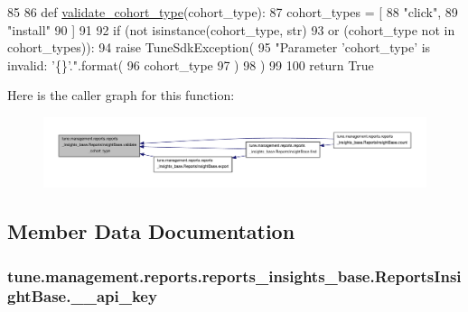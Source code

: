 \begin{DoxyCode}
85 
86     \textcolor{keyword}{def }\hyperlink{classtune_1_1management_1_1reports_1_1reports__insights__base_1_1ReportsInsightBase_a78f6a5bfe7258d65e381281510ae9909}{validate\_cohort\_type}(cohort\_type):
87         cohort\_types = [
88             \textcolor{stringliteral}{"click"},
89             \textcolor{stringliteral}{"install"}
90         ]
91 
92         \textcolor{keywordflow}{if} (\textcolor{keywordflow}{not} isinstance(cohort\_type, str)
93             \textcolor{keywordflow}{or} (cohort\_type \textcolor{keywordflow}{not} \textcolor{keywordflow}{in} cohort\_types)):
94             \textcolor{keywordflow}{raise} TuneSdkException(
95                 \textcolor{stringliteral}{"Parameter 'cohort\_type' is invalid: '\{\}'."}.format(
96                 cohort\_type
97                 )
98             )
99 
100         \textcolor{keywordflow}{return} \textcolor{keyword}{True}

\end{DoxyCode}


Here is the caller graph for this function\-:
\nopagebreak
\begin{figure}[H]
\begin{center}
\leavevmode
\includegraphics[width=350pt]{classtune_1_1management_1_1reports_1_1reports__insights__base_1_1ReportsInsightBase_a78f6a5bfe7258d65e381281510ae9909_icgraph}
\end{center}
\end{figure}




\subsection{Member Data Documentation}
\hypertarget{classtune_1_1management_1_1reports_1_1reports__insights__base_1_1ReportsInsightBase_a0d22e330edc50e64ff0a26b6f6f6154a}{
\subsubsection[{\-\_\-\-\_\-api\-\_\-key}]{\setlength{\rightskip}{0pt plus 5cm}tune.\-management.\-reports.\-reports\-\_\-insights\-\_\-base.\-Reports\-Insight\-Base.\-\_\-\-\_\-api\-\_\-key\hspace{0.3cm}{\ttfamily [private]}}}\label{classtune_1_1management_1_1reports_1_1reports__insights__base_1_1ReportsInsightBase_a0d22e330edc50e64ff0a26b6f6f6154a}


